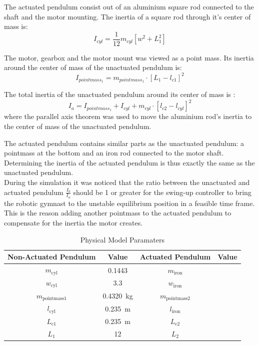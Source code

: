 The actuated pendulum consist out of an aluminium square rod connected to the shaft and the motor mounting. The inertia of a square rod through it's center of mass is: $$ I_{cyl} = \frac{1}{12}m_{cyl}[w^2+L^2_{1}]$$

The motor, gearbox and the motor mount was viewed as a point mass. Its inertia around the center of mass of the unactuated pendulum is: $$I_{pointmass_1} = m_{pointmass_1}\cdot[L_{1}-l_{c1}]^2 $$

The total inertia of the unactuated pendulum around its center of mass is : $$ I_{a} =I_{pointmass_1} +  I_{cyl} + m_{cyl}\cdot[l_{c2}-l_{cyl}]^2 $$ where the parallel axis theorem was used to move the aluminium rod's inertia to the center of mass of the unactuated pendulum.

The actuated pendulum contains similar parts as the unactuated pendulum: a pointmass at the bottom and an iron rod connected to the motor shaft. Determining the inertia of the actuated pendulum is thus exactly the same as the unactuated pendulum.\\

During the simulation it was noticed that the ratio between the unactuated and actuated pendulum $\frac{I_{b}}{I_{a}}$ should be 1 or greater for the swing-up controller to bring the robotic gymnast to the unstable equilibrium position in a feasible time frame. This is the reason adding another pointmass to the actuated pendulum to compensate for the inertia the motor creates.


\begin{table}[]
	\centering
	\begin{tabular}{|c|c|c|c|}
		\hline
		Non-Actuated Pendulum& Value & Actuated Pendulum & Value \\
		\hline
		\hline
		$m_{\text{cyl}}$ & \SI{0.1443}{} & $m_{\text{iron}}$ &\\
		\hline
		$w_{\text{cyl}}$ & \SI{3.3}{}& $w_{\text{iron}}$& \\
		\hline
		$m_{\text{pointmass1}}$ & \SI{0.4320}{\kilogram}& $m_{\text{pointmass2}}$& \\
		\hline
		$l_{\text{cyl}}$ & \SI{0.235}{\meter}& $l_{\text{iron}}$& \\
		\hline
		$L_{\text{c1}}$ & \SI{0.235}{\meter} & $L_{\text{c2}}$&\\
		\hline
		$L_{1}$ & \SI{12}{}& $L_{2}$& \\
		\hline
	\end{tabular}
	\caption{Physical Model Paramaters}
	\label{table:model_param}
\end{table}

